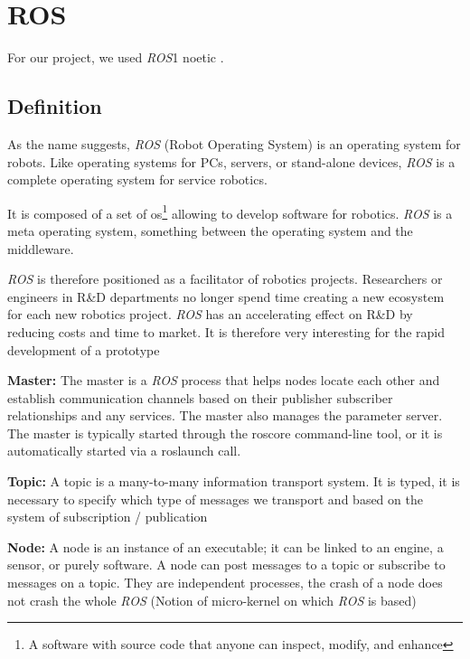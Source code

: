 \section{ROS}\insertloftspace
\setcounter{figure}{0}\setcounter{table}{0}

For our project, we used \textit{ROS}1 noetic \cite{ROS}.

\subsection{Definition}

As the name suggests, \textit{ROS} (Robot Operating System) is an operating system for robots. Like operating systems for PCs, servers, or stand-alone devices, \textit{ROS} is a complete operating system for service robotics.

\bigbreak
It is composed of a set of \gls{os}\footnote{A software with source code that anyone can inspect, modify, and enhance} allowing to develop software for robotics. \textit{ROS} is a meta operating system, something between the operating system and the middleware.

\bigbreak
\textit{ROS} is therefore positioned as a facilitator of robotics projects. Researchers or engineers in R\&D departments no longer spend time creating a new ecosystem for each new robotics project. \textit{ROS} has an accelerating effect on R\&D by reducing costs and time to market. It is therefore very interesting for the rapid development of a prototype

\bigbreak
\textbf{Master:} The master is a \textit{ROS} process that helps nodes locate each other and establish communication channels based on their publisher subscriber relationships and any services. The master also manages the parameter server. The master is typically started through the roscore command-line tool, or it is automatically started via a roslaunch call.

\bigbreak
\textbf{Topic:} A topic is a many-to-many information transport system. It is typed, it is necessary to specify which type of messages we transport and based on the system of subscription / publication 

\bigbreak
\textbf{Node:} A node is an instance of an executable; it can be linked to an engine, a sensor, or purely software. A node can post messages to a topic or subscribe to messages on a topic. They are independent processes, the crash of a node does not crash the whole \textit{ROS} (Notion of micro-kernel on which \textit{ROS} is based)

